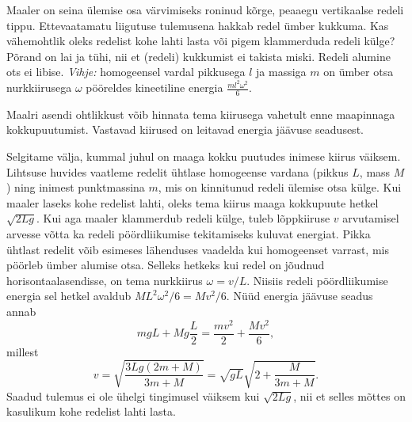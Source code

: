 
Maaler on seina ülemise osa värvimiseks roninud kõrge, peaaegu vertikaalse
redeli tippu. Ettevaatamatu liigutuse tulemusena hakkab redel ümber kukkuma. Kas
vähemohtlik oleks redelist kohe lahti lasta või pigem klammerduda redeli külge?
Põrand on lai ja tühi, nii et (redeli) kukkumist ei takista miski. Redeli alumine
ots ei libise.
\emph{Vihje:} homogeensel vardal pikkusega $l$ ja massiga $m$ on ümber otsa
nurkkiirusega $\omega$ pööreldes kineetiline energia $\frac{m l^2 \omega^2}{6}$.

\hint
Maalri asendi ohtlikkust võib hinnata tema kiirusega vahetult enne maapinnaga kokkupuutumist. Vastavad kiirused on leitavad energia jäävuse seadusest.

\solu
Selgitame välja, kummal juhul on maaga kokku puutudes inimese kiirus väiksem. Lihtsuse huvides vaatleme redelit ühtlase
homogeense vardana (pikkus $L$, mass $M$) ning inimest punktmassina $m$, mis on kinnitunud redeli ülemise otsa külge. Kui maaler laseks kohe redelist lahti, oleks tema kiirus maaga kokkupuute hetkel $\sqrt{2Lg}$. Kui aga maaler klammerdub redeli külge, tuleb lõppkiiruse $v$ arvutamisel arvesse võtta ka redeli pöördliikumise tekitamiseks kuluvat energiat. Pikka ühtlast redelit võib esimeses lähenduses vaadelda kui homogeenset varrast, mis pöörleb ümber alumise otsa. Selleks hetkeks kui redel on jõudnud horisontaalasendisse, on tema nurkkiirus $\omega=v/L$. Niisiis redeli pöördliikumise energia sel hetkel avaldub $ML^2\omega^2/6=Mv^2/6$. Nüüd energia jäävuse seadus annab
\[
mgL+Mg\frac{L}{2}=\frac{mv^2}{2} +\frac{Mv^2}{6},
\]
millest
\[
v=\sqrt{\frac{3Lg(2m+M)}{3m+M}}=\sqrt{gL}\sqrt{2+\frac{M}{3m+M}}.
\]
Saadud tulemus ei ole ühelgi tingimusel väiksem kui $\sqrt{2Lg}$, nii et selles mõttes on kasulikum kohe redelist lahti lasta.
\probend